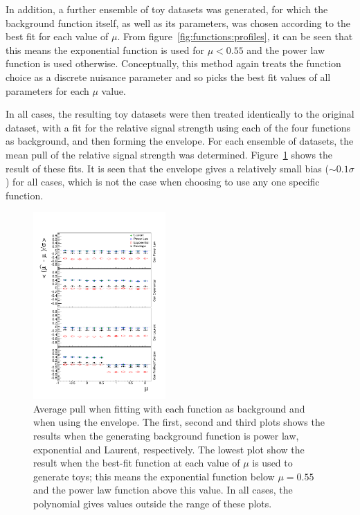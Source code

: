 In addition, a further ensemble of toy datasets was generated, for which the
background function itself, as well as its parameters, was chosen according to
the best fit for each value of $\mu$. From figure~\ref{fig:functions:profiles},
it can be seen that this means the exponential function is used for $\mu<0.55$
and the power law function is used otherwise. Conceptually, this method again
treats the function choice as a discrete nuisance parameter and so picks the
best fit values of all parameters for each $\mu$ value.

In all cases, the resulting toy datasets were then treated identically to the
original dataset, with a fit for the relative signal strength using
each of the four functions as background, and then forming the envelope.
For each ensemble of datasets, the mean pull of the relative
signal strength was determined. Figure~\ref{fig:functions:firstorderbias}
shows the result of these fits. It is seen that the envelope gives a
relatively small
bias ($\sim 0.1\sigma$) for all cases, 
which is not the case when choosing to use
any one specific function.
%
\begin{figure}[tbp]
\centering
\includegraphics[width=0.45\textwidth]{functions/FirstOrderFunctions.pdf}
\caption{Average pull when fitting with each function as background and when
using the envelope. The first, second and third plots shows the results
when the generating background function is power law, exponential and Laurent,
respectively. The lowest plot show the result when the best-fit function at each
value of $\mu$ is used to generate toys; this means the exponential function
below $\mu = 0.55$ and the power law function above this value. In all cases,
the polynomial gives values outside the range of these plots.}
\label{fig:functions:firstorderbias}
\end{figure}

